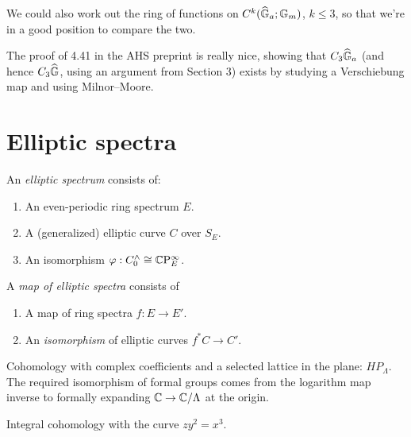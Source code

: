 We could also work out the ring of functions on $C^k(\widehat{\mathbb G}_a; \mathbb G_m)$, $k \le 3$, so that we're in a good position to compare the two.

The proof of 4.41 in the AHS preprint is really nice, showing that $C_3 \widehat{\mathbb G}_a$ (and hence $C_3 \widehat{\mathbb G}$, using an argument from Section 3) exists by studying a Verschiebung map and using Milnor--Moore.






\section{Elliptic spectra}

\begin{definition}
An \textit{elliptic spectrum} consists of:
\begin{enumerate}
\item An even-periodic ring spectrum $E$.
\item A (generalized) elliptic curve $C$ over $S_E$.
\item An isomorphism $\varphi: C^\wedge_0 \cong \mathbb{C}\mathrm P^\infty_E$.
\end{enumerate}
A \textit{map of elliptic spectra} consists of
\begin{enumerate}
\item A map of ring spectra $f: E \to E'$.
\item An \emph{isomorphism} of elliptic curves $f^* C \to C'$.
\end{enumerate}
\end{definition}


\begin{example}
Cohomology with complex coefficients and a selected lattice in the plane: $HP_\Lambda$.  The required isomorphism of formal groups comes from the logarithm map inverse to formally expanding $\mathbb{C} \to \mathbb{C}/\Lambda$ at the origin.
\end{example}

\begin{example}
Integral cohomology with the curve $zy^2 = x^3$.
\end{example}

